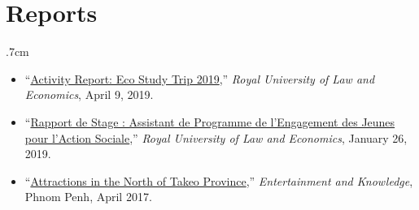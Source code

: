 \documentclass[10pt,a4paper]{article}
\begin{document}
\section*{Reports}	
		\vspace{-1em}
		\begin{adjustwidth}{.7cm}{}
			\begin{itemize}[label={},itemindent=-2em,leftmargin=2em]
				
				\item “\href{https://nithkosal.github.io/research/reports/EcoStudy_2019.pdf}{Activity Report: Eco Study Trip 2019},” \textit{Royal University of Law and Economics}, April 9, 2019. 
				
				\item “\href{https://www.researchgate.net/publication/330936932_Rapport_du_Stage_Assistant_de_Programme_a_l%27YRDP}{Rapport de Stage : Assistant de Programme de l'Engagement des Jeunes pour l'Action Sociale},” \textit{Royal University of Law and Economics}, January 26, 2019.
					
				\item “\href{https://www.facebook.com/7khmer/photos/?tab=album&album_id=878953958911035}{Attractions in the North of Takeo Province},” \textit{Entertainment and Knowledge}, Phnom Penh, April 2017. 
					
			\end{itemize}
		\end{adjustwidth}			
		\vspace{-1em}
\end{document}
